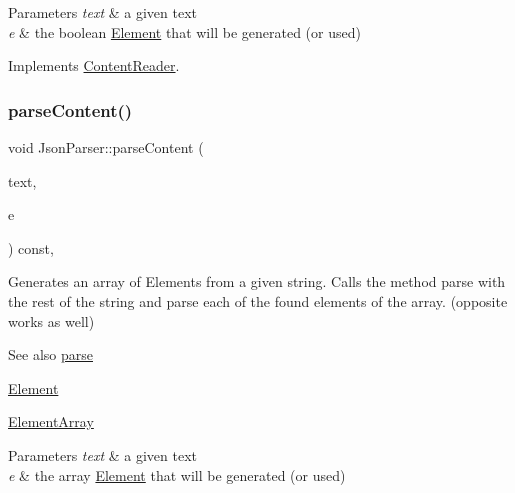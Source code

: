 \begin{DoxyParams}{Parameters}
{\em text} & a given text \\
\hline
{\em e} & the boolean \mbox{\hyperlink{classElement}{Element}} that will be generated (or used) \\
\hline
\end{DoxyParams}


Implements \mbox{\hyperlink{classContentReader_a3ee0aec579c723f17742e10fe7c75e39}{Content\+Reader}}.

\mbox{\label{classJsonParser_aa728c443b247b83cdf6cedb406d8940d}} 
\subsubsection{\texorpdfstring{parse\+Content()}{parseContent()}\hspace{0.1cm}{\footnotesize\ttfamily [4/6]}}
{\footnotesize\ttfamily void Json\+Parser\+::parse\+Content (\begin{DoxyParamCaption}\item[{std\+::string \&}]{text,  }\item[{\mbox{\hyperlink{classElementArray}{Element\+Array}} $\ast$}]{e }\end{DoxyParamCaption}) const\hspace{0.3cm}{\ttfamily [override]}, {\ttfamily [virtual]}}

Generates an array of Elements from a given string. Calls the method parse with the rest of the string and parse each of the found elements of the array. (opposite works as well) \begin{DoxySeeAlso}{See also}
\mbox{\hyperlink{classJsonParser_a3ec3a9fcc8a63f987b4749d60b0568df}{parse}} 

\mbox{\hyperlink{classElement}{Element}} 

\mbox{\hyperlink{classElementArray}{Element\+Array}}
\end{DoxySeeAlso}

\begin{DoxyParams}{Parameters}
{\em text} & a given text \\
\hline
{\em e} & the array \mbox{\hyperlink{classElement}{Element}} that will be generated (or used) \\
\hline
\end{DoxyParams}


